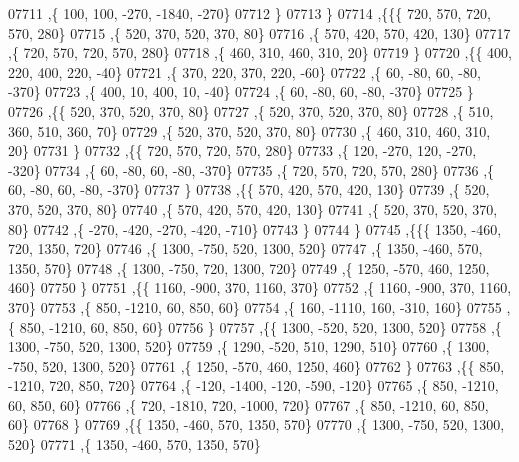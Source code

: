 \begin{DoxyCode}
07711     ,\{   100,   100,  -270, -1840,  -270\}
07712     \}
07713    \}
07714   ,\{\{\{   720,   570,   720,   570,   280\}
07715     ,\{   520,   370,   520,   370,    80\}
07716     ,\{   570,   420,   570,   420,   130\}
07717     ,\{   720,   570,   720,   570,   280\}
07718     ,\{   460,   310,   460,   310,    20\}
07719     \}
07720    ,\{\{   400,   220,   400,   220,   -40\}
07721     ,\{   370,   220,   370,   220,   -60\}
07722     ,\{    60,   -80,    60,   -80,  -370\}
07723     ,\{   400,    10,   400,    10,   -40\}
07724     ,\{    60,   -80,    60,   -80,  -370\}
07725     \}
07726    ,\{\{   520,   370,   520,   370,    80\}
07727     ,\{   520,   370,   520,   370,    80\}
07728     ,\{   510,   360,   510,   360,    70\}
07729     ,\{   520,   370,   520,   370,    80\}
07730     ,\{   460,   310,   460,   310,    20\}
07731     \}
07732    ,\{\{   720,   570,   720,   570,   280\}
07733     ,\{   120,  -270,   120,  -270,  -320\}
07734     ,\{    60,   -80,    60,   -80,  -370\}
07735     ,\{   720,   570,   720,   570,   280\}
07736     ,\{    60,   -80,    60,   -80,  -370\}
07737     \}
07738    ,\{\{   570,   420,   570,   420,   130\}
07739     ,\{   520,   370,   520,   370,    80\}
07740     ,\{   570,   420,   570,   420,   130\}
07741     ,\{   520,   370,   520,   370,    80\}
07742     ,\{  -270,  -420,  -270,  -420,  -710\}
07743     \}
07744    \}
07745   ,\{\{\{  1350,  -460,   720,  1350,   720\}
07746     ,\{  1300,  -750,   520,  1300,   520\}
07747     ,\{  1350,  -460,   570,  1350,   570\}
07748     ,\{  1300,  -750,   720,  1300,   720\}
07749     ,\{  1250,  -570,   460,  1250,   460\}
07750     \}
07751    ,\{\{  1160,  -900,   370,  1160,   370\}
07752     ,\{  1160,  -900,   370,  1160,   370\}
07753     ,\{   850, -1210,    60,   850,    60\}
07754     ,\{   160, -1110,   160,  -310,   160\}
07755     ,\{   850, -1210,    60,   850,    60\}
07756     \}
07757    ,\{\{  1300,  -520,   520,  1300,   520\}
07758     ,\{  1300,  -750,   520,  1300,   520\}
07759     ,\{  1290,  -520,   510,  1290,   510\}
07760     ,\{  1300,  -750,   520,  1300,   520\}
07761     ,\{  1250,  -570,   460,  1250,   460\}
07762     \}
07763    ,\{\{   850, -1210,   720,   850,   720\}
07764     ,\{  -120, -1400,  -120,  -590,  -120\}
07765     ,\{   850, -1210,    60,   850,    60\}
07766     ,\{   720, -1810,   720, -1000,   720\}
07767     ,\{   850, -1210,    60,   850,    60\}
07768     \}
07769    ,\{\{  1350,  -460,   570,  1350,   570\}
07770     ,\{  1300,  -750,   520,  1300,   520\}
07771     ,\{  1350,  -460,   570,  1350,   570\}

\end{DoxyCode}
